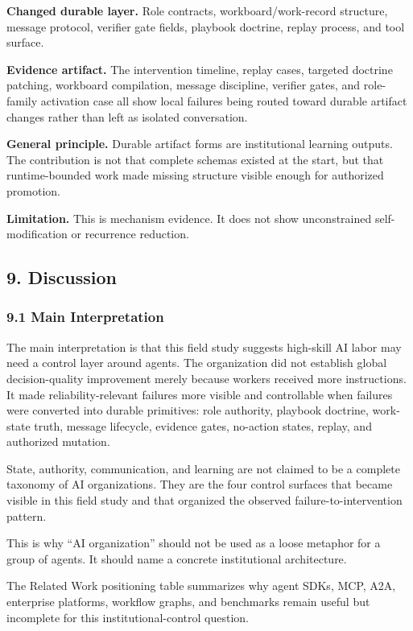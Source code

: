 \documentclass[
]{article}
\begin{document}
\textbf{Changed durable layer.} Role contracts, workboard/work-record structure, message protocol, verifier gate fields, playbook doctrine, replay process, and tool surface.

\textbf{Evidence artifact.} The intervention timeline, replay cases, targeted doctrine patching, workboard compilation, message discipline, verifier gates, and role-family activation case all show local failures being routed toward durable artifact changes rather than left as isolated conversation.

\textbf{General principle.} Durable artifact forms are institutional learning outputs. The contribution is not that complete schemas existed at the start, but that runtime-bounded work made missing structure visible enough for authorized promotion.

\textbf{Limitation.} This is mechanism evidence. It does not show unconstrained self-modification or recurrence reduction.

\subsection{9. Discussion}\label{discussion}

\subsubsection{9.1 Main Interpretation}\label{main-interpretation}

The main interpretation is that this field study suggests high-skill AI labor may need a control layer around agents. The organization did not establish global decision-quality improvement merely because workers received more instructions. It made reliability-relevant failures more visible and controllable when failures were converted into durable primitives: role authority, playbook doctrine, work-state truth, message lifecycle, evidence gates, no-action states, replay, and authorized mutation.

State, authority, communication, and learning are not claimed to be a complete taxonomy of AI organizations. They are the four control surfaces that became visible in this field study and that organized the observed failure-to-intervention pattern.

This is why ``AI organization'' should not be used as a loose metaphor for a group of agents. It should name a concrete institutional architecture.

The Related Work positioning table summarizes why agent SDKs, MCP, A2A, enterprise platforms, workflow graphs, and benchmarks remain useful but incomplete for this institutional-control question.
\end{document}
